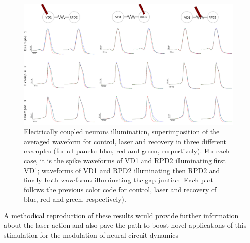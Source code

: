 \begin{figure}[hbt]
	\centering
	\includegraphics[width=\textwidth]{img/laser/electrical/electrical_results_reduced.pdf}
    \caption{Electrically coupled neurons illumination, superimposition of the averaged waveform for control, laser and recovery in three different examples (for all panels: blue, red and green, respectively). For each case, it is the spike waveforms of VD1 and RPD2 illuminating first VD1; waveforms of VD1 and RPD2 illuminating then RPD2 and finally both waveforms illuminating the gap juntion. Each plot follows the previous color code for control, laser and recovery of blue, red and green, respectively).}
    \label{fig:electrical results}
\end{figure}


A methodical reproduction of these results would provide further information about the laser action and also pave the path to boost novel applications of this stimulation for the modulation of neural circuit dynamics.


